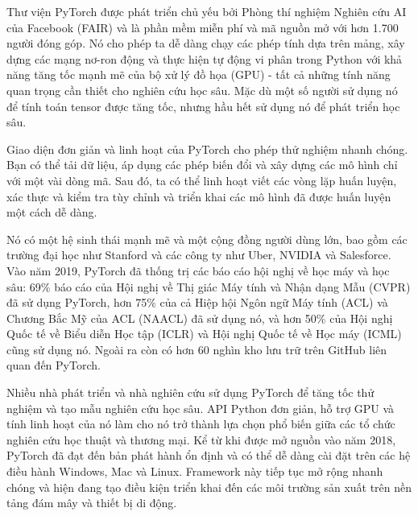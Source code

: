 \documentclass[../main.tex]{subfiles}
\begin{document}
Thư viện PyTorch được phát triển chủ yếu bởi Phòng thí nghiệm Nghiên cứu AI của Facebook (FAIR) và là phần mềm miễn phí và mã nguồn mở với hơn 1.700 người đóng góp. Nó cho phép ta dễ dàng chạy các phép tính dựa trên mảng, xây dựng các mạng nơ-ron động và thực hiện tự động vi phân trong Python với khả năng tăng tốc mạnh mẽ của bộ xử lý đồ họa (GPU) - tất cả những tính năng quan trọng cần thiết cho nghiên cứu học sâu. Mặc dù một số người sử dụng nó để tính toán tensor được tăng tốc, nhưng hầu hết sử dụng nó để phát triển học sâu.

Giao diện đơn giản và linh hoạt của PyTorch cho phép thử nghiệm nhanh chóng. Bạn có thể tải dữ liệu, áp dụng các phép biến đổi và xây dựng các mô hình chỉ với một vài dòng mã. Sau đó, ta có thể linh hoạt viết các vòng lặp huấn luyện, xác thực và kiểm tra tùy chỉnh và triển khai các mô hình đã được huấn luyện một cách dễ dàng.

Nó có một hệ sinh thái mạnh mẽ và một cộng đồng người dùng lớn, bao gồm các trường đại học như Stanford và các công ty như Uber, NVIDIA và Salesforce. Vào năm 2019, PyTorch đã thống trị các báo cáo hội nghị về học máy và học sâu: 69\% báo cáo của Hội nghị về Thị giác Máy tính và Nhận dạng Mẫu (CVPR) đã sử dụng PyTorch, hơn 75\% của cả Hiệp hội Ngôn ngữ Máy tính (ACL) và Chương Bắc Mỹ của ACL (NAACL) đã sử dụng nó, và hơn 50\% của Hội nghị Quốc tế về Biểu diễn Học tập (ICLR) và Hội nghị Quốc tế về Học máy (ICML) cũng sử dụng nó. Ngoài ra còn có hơn 60 nghìn kho lưu trữ trên GitHub liên quan đến PyTorch.

Nhiều nhà phát triển và nhà nghiên cứu sử dụng PyTorch để tăng tốc thử nghiệm và tạo mẫu nghiên cứu học sâu. API Python đơn giản, hỗ trợ GPU và tính linh hoạt của nó làm cho nó trở thành lựa chọn phổ biến giữa các tổ chức nghiên cứu học thuật và thương mại. Kể từ khi được mở nguồn vào năm 2018, PyTorch đã đạt đến bản phát hành ổn định và có thể dễ dàng cài đặt trên các hệ điều hành Windows, Mac và Linux. Framework này tiếp tục mở rộng nhanh chóng và hiện đang tạo điều kiện triển khai đến các môi trường sản xuất trên nền tảng đám mây và thiết bị di động.
\end{document}
